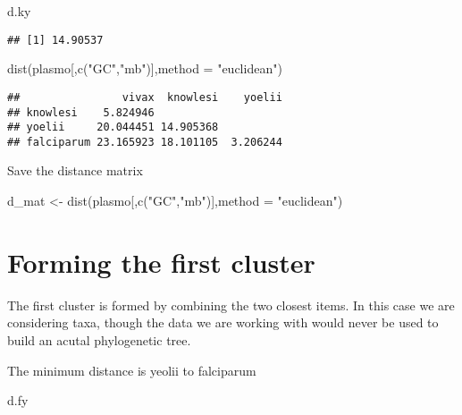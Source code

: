 \documentclass[
]{book}
\newenvironment{Shaded}{\begin{snugshade}}{\end{snugshade}}
\newcommand{\AttributeTok}[1]{\textcolor[rgb]{0.77,0.63,0.00}{#1}}
\newcommand{\FunctionTok}[1]{\textcolor[rgb]{0.00,0.00,0.00}{#1}}
\newcommand{\NormalTok}[1]{#1}
\newcommand{\OtherTok}[1]{\textcolor[rgb]{0.56,0.35,0.01}{#1}}
\newcommand{\StringTok}[1]{\textcolor[rgb]{0.31,0.60,0.02}{#1}}
\begin{document}
\begin{Shaded}
\begin{Highlighting}[]
\NormalTok{d.ky}
\end{Highlighting}
\end{Shaded}

\begin{verbatim}
## [1] 14.90537
\end{verbatim}

\begin{Shaded}
\begin{Highlighting}[]
\FunctionTok{dist}\NormalTok{(plasmo[,}\FunctionTok{c}\NormalTok{(}\StringTok{"GC"}\NormalTok{,}\StringTok{"mb"}\NormalTok{)],}\AttributeTok{method =} \StringTok{"euclidean"}\NormalTok{)}
\end{Highlighting}
\end{Shaded}

\begin{verbatim}
##                vivax  knowlesi    yoelii
## knowlesi    5.824946                    
## yoelii     20.044451 14.905368          
## falciparum 23.165923 18.101105  3.206244
\end{verbatim}

Save the distance matrix

\begin{Shaded}
\begin{Highlighting}[]
\NormalTok{d\_mat }\OtherTok{\textless{}{-}} \FunctionTok{dist}\NormalTok{(plasmo[,}\FunctionTok{c}\NormalTok{(}\StringTok{"GC"}\NormalTok{,}\StringTok{"mb"}\NormalTok{)],}\AttributeTok{method =} \StringTok{"euclidean"}\NormalTok{)}
\end{Highlighting}
\end{Shaded}

\hypertarget{forming-the-first-cluster}{%
\section{Forming the first cluster}\label{forming-the-first-cluster}}

The first cluster is formed by combining the two closest items. In this case we are considering taxa, though the data we are working with would never be used to build an acutal phylogenetic tree.

The minimum distance is yeolii to falciparum

\begin{Shaded}
\begin{Highlighting}[]
\NormalTok{d.fy}
\end{Highlighting}
\end{Shaded}
\end{document}
